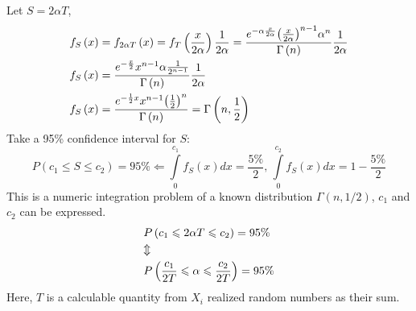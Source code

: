 \documentclass{article}
\begin{document}
Let $S=2\alpha T$,
\[\begin{gathered}
        {f_S}\left( x \right) = {f_{2\alpha T}}\left( x \right) = {f_T}\left( {\frac{x}{{2\alpha }}} \right)\frac{1}{{2\alpha }} = \frac{{{e^{ - \alpha \frac{x}{{2\alpha }}}}{{\left( {\frac{x}{{2\alpha }}} \right)}^{n - 1}}{\alpha ^n}}}{{\Gamma \left( n \right)}}\frac{1}{{2\alpha }} \hfill\\
        {f_S}\left( x \right) = \frac{{{e^{ - \frac{x}{2}}}{x^{n - 1}}\alpha \frac{1}{{{2^{n - 1}}}}}}{{\Gamma \left( n \right)}}\frac{1}{{2\alpha }} \hfill \\
        {f_S}\left( x \right) = \frac{{{e^{ - \frac{1}{2}x}}{x^{n - 1}}{{\left( {\frac{1}{2}} \right)}^n}}}{{\Gamma \left( n \right)}} = \Gamma \left( {n,\frac{1}{2}} \right) \hfill \\
    \end{gathered} \]
Take a 95\% confidence interval for $S$:
\[P\left( {{c_1} \leqslant S \leqslant {c_2}} \right) = 95\%  \Leftarrow \int\limits_0^{{c_1}} {{f_S}\left( x \right)dx}  = \frac{{5\% }}{2},\,\int\limits_0^{{c_2}} {{f_S}\left( x \right)dx}  = 1 - \frac{{5\% }}{2}\]
This is a numeric integration problem of a known distribution $\Gamma(n,1/2)$, $c_1$ and $c_2$ can be expressed.
\[\begin{gathered}
        P\left( {{c_1} \leqslant 2\alpha T \leqslant {c_2}} \right) = 95\%  \hfill \\
        \Updownarrow  \hfill \\
        P\left( {\frac{{{c_1}}}{{2T}} \leqslant \alpha  \leqslant \frac{{{c_2}}}{{2T}}} \right) = 95\%  \hfill \\
    \end{gathered} \]
Here, $T$ is a calculable quantity from $X_i$ realized random numbers as their sum.
\end{document}
